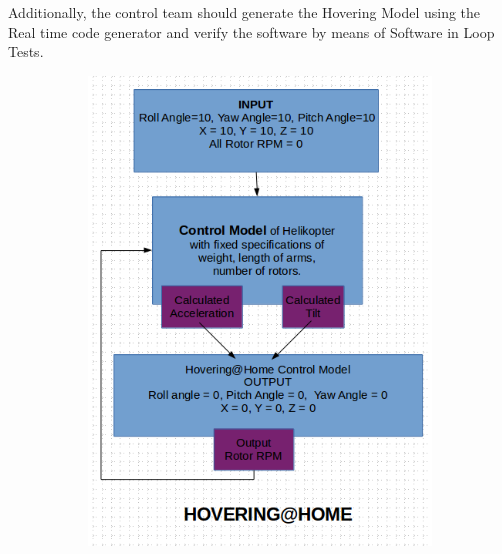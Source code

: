 \documentclass[a4paper,11pt]{article}
\begin{document}
Additionally, the control team should generate the Hovering Model using the Real time code generator and verify the  software by means of Software in Loop Tests.


\begin{figure}[ht]
\begin{subfigure}{0.5\textwidth}
\includegraphics[scale=0.5]{pics/Control1.png}
\end{subfigure}
\begin{subfigure}{1\textwidth}

\end{subfigure}
\end{figure}
\end{document}
